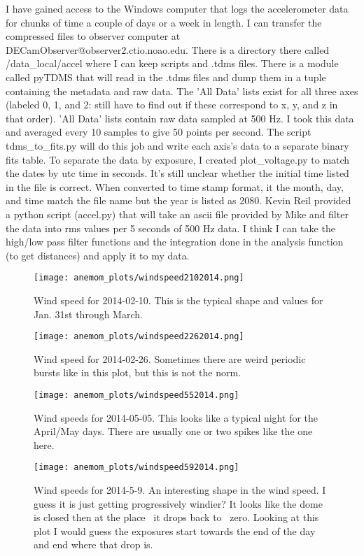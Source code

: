 \documentclass{article}
\begin{document}
I have gained access to the Windows computer that logs the accelerometer data for chunks of time a couple of days or a week in length. 
I can transfer the compressed files to observer computer at DECamObserver@observer2.ctio.noao.edu. 
There is a directory there called /data_local/accel where I can keep scripts and .tdms files. 
There is a module called pyTDMS that will read in the .tdms files and dump them in a tuple containing the metadata and raw data. 
The 'All Data' lists exist for all three axes (labeled 0, 1, and 2: still have to find out if these correspond to x, y, and z in that order).
'All Data' lists contain raw data sampled at 500 Hz. 
I took this data and averaged every 10 samples to give 50 points per second.
The script tdms_to_fits.py will do this job and write each axis's data to a separate binary fits table. 
To separate the data by exposure, I created plot_voltage.py to match the dates by utc time in seconds. 
It's still unclear whether the initial time listed in the file is correct.
When converted to time stamp format, it the month, day, and time match the file name but the year is listed as 2080. 
Kevin Reil provided a python script (accel.py) that will take an ascii file provided by Mike and filter the data into rms values per 5 seconds of 500 Hz data.
I think I can take the high/low pass filter functions and the integration done in the analysis function (to get distances) and apply it to my data. 

\begin{figure}[h!]
  \centering
  \texttt{[image: anemom\_plots/windspeed2102014.png]}
  \caption{Wind speed for 2014-02-10. This is the typical shape and values for Jan. 31st through March.}
\end{figure}

\begin{figure}[h!]
  \centering
  \texttt{[image: anemom\_plots/windspeed2262014.png]}
  \caption{Wind speed for 2014-02-26. Sometimes there are weird periodic bursts like in this plot, but this is not the norm.}
\end{figure}

\begin{figure}[h!]
  \centering
  \texttt{[image: anemom\_plots/windspeed552014.png]}
  \caption{Wind speeds for 2014-05-05. This looks like a typical night for the April/May days. There are usually one or two spikes like the one here.}
\end{figure}

\begin{figure}[h!]
  \centering
  \texttt{[image: anemom\_plots/windspeed592014.png]}
  \caption{Wind speeds for 2014-5-9. An interesting shape in the wind speed. I guess it is just getting progressively windier? It looks like the dome is closed then at the place \
it drops back to ~zero. Looking at this plot I would guess the exposures start towards the end of the day and end where that drop is.}
\end{figure}
\end{document}
